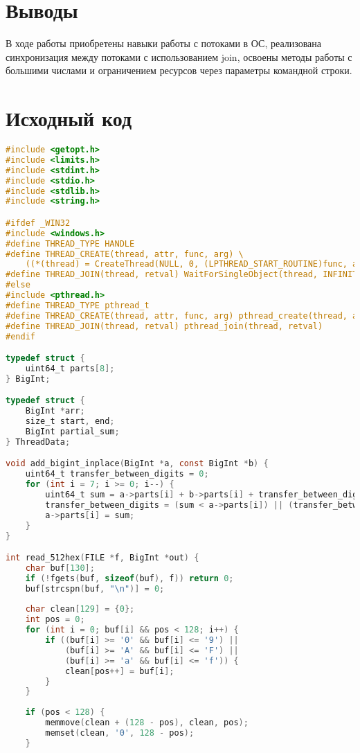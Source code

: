 \documentclass[12pt,a4paper]{article}
\begin{document}
\begin{itemize}
\section*{Выводы}
В ходе работы приобретены навыки работы с потоками в ОС, реализована синхронизация между потоками с использованием join, освоены методы работы с большими числами и ограничением ресурсов через параметры командной строки.

\newpage
\section*{Исходный код}
\begin{lstlisting}[language=C,caption=Основная программа]
#include <getopt.h>
#include <limits.h>
#include <stdint.h>
#include <stdio.h>
#include <stdlib.h>
#include <string.h>

#ifdef _WIN32
#include <windows.h>
#define THREAD_TYPE HANDLE
#define THREAD_CREATE(thread, attr, func, arg) \
    ((*(thread) = CreateThread(NULL, 0, (LPTHREAD_START_ROUTINE)func, arg, 0, NULL)) != NULL ? 0 : -1)
#define THREAD_JOIN(thread, retval) WaitForSingleObject(thread, INFINITE)
#else
#include <pthread.h>
#define THREAD_TYPE pthread_t
#define THREAD_CREATE(thread, attr, func, arg) pthread_create(thread, attr, func, arg)
#define THREAD_JOIN(thread, retval) pthread_join(thread, retval)
#endif

typedef struct {
    uint64_t parts[8];
} BigInt;

typedef struct {
    BigInt *arr;
    size_t start, end;
    BigInt partial_sum;
} ThreadData;

void add_bigint_inplace(BigInt *a, const BigInt *b) {
    uint64_t transfer_between_digits = 0;
    for (int i = 7; i >= 0; i--) {
        uint64_t sum = a->parts[i] + b->parts[i] + transfer_between_digits;
        transfer_between_digits = (sum < a->parts[i]) || (transfer_between_digits && sum == a->parts[i]);
        a->parts[i] = sum;
    }
}

int read_512hex(FILE *f, BigInt *out) {
    char buf[130];
    if (!fgets(buf, sizeof(buf), f)) return 0;
    buf[strcspn(buf, "\n")] = 0;
    
    char clean[129] = {0};
    int pos = 0;
    for (int i = 0; buf[i] && pos < 128; i++) {
        if ((buf[i] >= '0' && buf[i] <= '9') ||
            (buf[i] >= 'A' && buf[i] <= 'F') ||
            (buf[i] >= 'a' && buf[i] <= 'f')) {
            clean[pos++] = buf[i];
        }
    }
    
    if (pos < 128) {
        memmove(clean + (128 - pos), clean, pos);
        memset(clean, '0', 128 - pos);
    }
    

\end{lstlisting}
\end{itemize}
\end{document}
